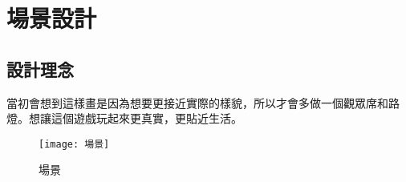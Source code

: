 \chapter{場景設計}
\section{設計理念}
 當初會想到這樣畫是因為想要更接近實際的樣貌，所以才會多做一個觀眾席和路燈。想讓這個遊戲玩起來更真實，更貼近生活。\\[6pt]
\begin{figure}[hbt!]
\begin{center}
\texttt{[image: 場景]}
\caption{\Large 場景}\label{場景}
\end{center}
\end{figure} 

\newpage